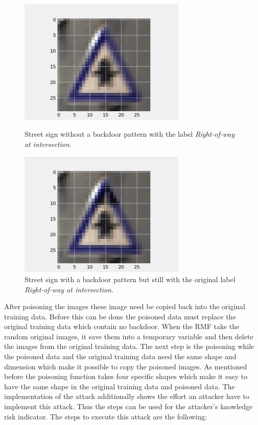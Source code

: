\begin{figure}[!tbp]
  \centering
  \begin{minipage}[b]{0.4\textwidth}
    \includegraphics[width=8cm]{pictures/original_example.png}
    \caption{Street sign without a backdoor pattern with the label \textit{Right-of-way at intersection}.}
    \label{fig:original_example}
  \end{minipage}
  \hfill
  \begin{minipage}[b]{0.4\textwidth}
    \includegraphics[width=8cm]{pictures/poisoned_example.png}
    \caption{Street sign with a backdoor pattern but still with the original label \textit{Right-of-way at intersection}.}
    \label{fig:poisoned_example}
  \end{minipage}
\end{figure}

After poisoning the images these image need be copied back into the original training data. Before this can be done the poisoned data must replace the original training data which contain
no backdoor. When the RMF take the random original images, it save them into a temporary variable and then delete the images from the original training data. The next step is the
poisoning while the poisoned data and the original training data need the same shape and dimension which make it possible to copy the poisoned images. As mentioned before the poisoning
function takes four specific shapes which make it easy to have the same shape in the original training data and poisoned data. The implementation of the attack additionally shows the
effort an attacker have to implement this attack. Thus the steps can be used for the attacker's knowledge risk indicator. The steps to execute this attack are the following: \\


